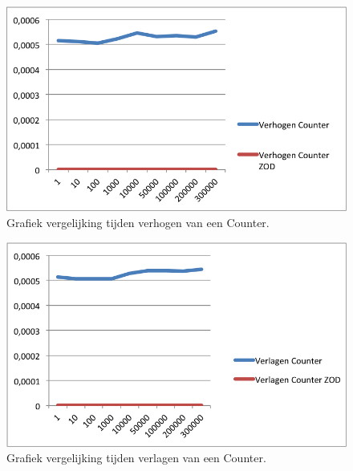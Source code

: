\begin{figure}[!h]
  \centering
  \includegraphics[scale=1.0]{Afbeeldingen/Evaluatie/VerhogenCounter}
  \caption{Grafiek vergelijking tijden verhogen van een Counter.}
  \label{fig:GraphCounterInc}
\end{figure}

\begin{figure}[!h]
  \centering
  \includegraphics[scale=1.0]{Afbeeldingen/Evaluatie/VerlagenCounter}
  \caption{Grafiek vergelijking tijden verlagen van een Counter.}
  \label{fig:GraphCounterDec}
\end{figure}





